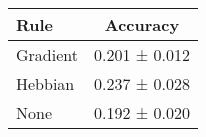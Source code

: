 \begin{tabular}{lc}
\toprule
Rule & Accuracy \\
\midrule
Gradient & 0.201 ± 0.012 \\
Hebbian & 0.237 ± 0.028 \\
None & 0.192 ± 0.020 \\
\bottomrule
\end{tabular}
